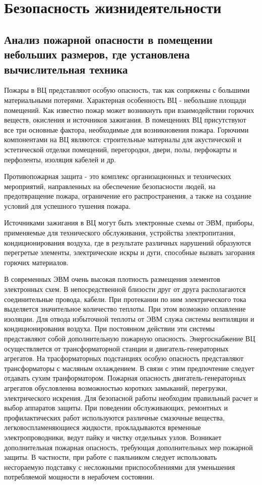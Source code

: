 \setcounter{section}{3}
\section{Безопасность жизнидеятельности}

\subsection{Анализ пожарной опасности в помещении небольших размеров, где установлена вычислительная техника}

Пожары в ВЦ представляют особую опасность, так как сопряжены с большими материальными потерями.
Характерная особенность ВЦ - небольшие площади помещений. Как известно пожар может возникнуть при взаимодействии
горючих веществ, окисления и источников зажигания. В помещениях ВЦ присутствуют все три основные фактора,
необходимые для возникновения пожара. Горючими компонентами на ВЦ являются: строительные материалы для
акустической и эстетической отделки помещений, перегородки, двери, полы, перфокарты и перфоленты, изоляция кабелей и др.

Противопожарная защита - это комплекс организационных и технических мероприятий, направленных на обеспечение безопасности людей,
на предотвращение пожара, ограничение его распространения, а также на создание условий для успешного тушения пожара.

Источниками зажигания в ВЦ могут быть электронные схемы от ЭВМ, приборы, применяемые для технического обслуживания,
устройства электропитания, кондиционирования воздуха, где в результате различных нарушений образуются перегретые элементы,
электрические искры и дуги, способные вызвать загорания горючих материалов.

В современных ЭВМ очень высокая плотность размещения элементов электронных схем. В непосредственной близости
друг от друга располагаются соединительные провода, кабели. При протекании по ним электрического тока выделяется
значительное количество теплоты. При этом возможно оплавление изоляции. Для отвода избыточной теплоты от ЭВМ служа
системы вентиляции и кондиционирования воздуха. При постоянном действии эти системы представляют собой дополнительную
пожарную опасность. Энергоснабжение ВЦ осуществляется от трансформаторной станции и двигатель-генераторных агрегатов.
На трасформаторных подстанциях особую опасность представляют трансформаторы с масляным охлаждением. В связи с этим
предпочтение следует отдавать сухим транформатором. Пожарная опасность двигатель-генераторных агрегатов обусловленна
возможностью коротких замыканий, перегрузки, электрического искрения. Для безопасной работы необходим правильный
расчет и выбор аппаратов защиты. При поведении обслуживающих, ремонтных и профилактических работ используются
различные смазочные вещества, легковоспламеняющиеся жидкости, прокладываются временные электропроводники, ведут пайку
и чистку отдельных узлов. Возникает дополнительная пожарная опасность, требующая дополнительных мер пожарной защиты.
В частности, при работе с паяльником следует использовать несгораемую подставку с несложными приспособлениями
для уменьшения потребляемой мощности в нерабочем состоянии.

